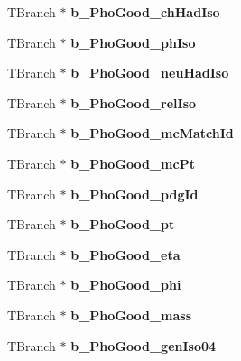 \begin{DoxyCompactItemize}
T\+Branch $\ast$ {\bfseries b\+\_\+\+Pho\+Good\+\_\+ch\+Had\+Iso}
\item 
\hypertarget{classMiniTree_a9a40f4166951537b5ae177654f855e62}{}\label{classMiniTree_a9a40f4166951537b5ae177654f855e62} 
T\+Branch $\ast$ {\bfseries b\+\_\+\+Pho\+Good\+\_\+ph\+Iso}
\item 
\hypertarget{classMiniTree_a9e1683f9fcbeecfb46ecf6dcb6bde32f}{}\label{classMiniTree_a9e1683f9fcbeecfb46ecf6dcb6bde32f} 
T\+Branch $\ast$ {\bfseries b\+\_\+\+Pho\+Good\+\_\+neu\+Had\+Iso}
\item 
\hypertarget{classMiniTree_a843841399c6ee5995d475844d84e4345}{}\label{classMiniTree_a843841399c6ee5995d475844d84e4345} 
T\+Branch $\ast$ {\bfseries b\+\_\+\+Pho\+Good\+\_\+rel\+Iso}
\item 
\hypertarget{classMiniTree_a57ca698c600f60300ab24eb66722529e}{}\label{classMiniTree_a57ca698c600f60300ab24eb66722529e} 
T\+Branch $\ast$ {\bfseries b\+\_\+\+Pho\+Good\+\_\+mc\+Match\+Id}
\item 
\hypertarget{classMiniTree_a702f7bfcd00b9c59627c74e512904f35}{}\label{classMiniTree_a702f7bfcd00b9c59627c74e512904f35} 
T\+Branch $\ast$ {\bfseries b\+\_\+\+Pho\+Good\+\_\+mc\+Pt}
\item 
\hypertarget{classMiniTree_a635d787e6524aaf19023a2f83f547f54}{}\label{classMiniTree_a635d787e6524aaf19023a2f83f547f54} 
T\+Branch $\ast$ {\bfseries b\+\_\+\+Pho\+Good\+\_\+pdg\+Id}
\item 
\hypertarget{classMiniTree_a243a8b3af3617cafcb1ab5b62ba61f62}{}\label{classMiniTree_a243a8b3af3617cafcb1ab5b62ba61f62} 
T\+Branch $\ast$ {\bfseries b\+\_\+\+Pho\+Good\+\_\+pt}
\item 
\hypertarget{classMiniTree_a009d381acd763cdd2ddc33d742f3e297}{}\label{classMiniTree_a009d381acd763cdd2ddc33d742f3e297} 
T\+Branch $\ast$ {\bfseries b\+\_\+\+Pho\+Good\+\_\+eta}
\item 
\hypertarget{classMiniTree_aa036b4ab42736aba9645de38ff76fb43}{}\label{classMiniTree_aa036b4ab42736aba9645de38ff76fb43} 
T\+Branch $\ast$ {\bfseries b\+\_\+\+Pho\+Good\+\_\+phi}
\item 
\hypertarget{classMiniTree_ac5c912aba8269322d71e8db3918593c5}{}\label{classMiniTree_ac5c912aba8269322d71e8db3918593c5} 
T\+Branch $\ast$ {\bfseries b\+\_\+\+Pho\+Good\+\_\+mass}
\item 
\hypertarget{classMiniTree_a28fc7a197e718c71aaafeab0284e91e2}{}\label{classMiniTree_a28fc7a197e718c71aaafeab0284e91e2} 
T\+Branch $\ast$ {\bfseries b\+\_\+\+Pho\+Good\+\_\+gen\+Iso04}
\item 

\end{DoxyCompactItemize}
